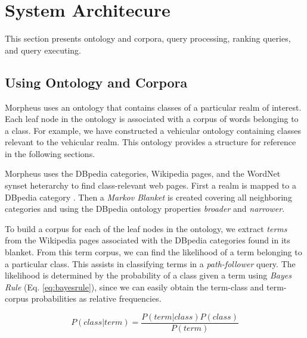 \section{System Architecure}
\label{sec:systemarch}

This section presents ontology and corpora, query processing, ranking queries, and query executing.

\subsection{Using Ontology and Corpora} 
\label{sec:ontology_corpora}

Morpheus uses an ontology that contains classes of a particular realm of interest. Each leaf node in the ontology is associated with a corpus of words belonging to a class.  For example, we have constructed a vehicular ontology containing classes relevant to the vehicular realm. This ontology provides a structure for reference in the following sections.



Morpheus uses the DBpedia categories, Wikipedia pages, and the WordNet synset heterarchy to find class-relevant web pages. First a realm is mapped to a DBpedia category \cite{Bizer2009}. Then a \emph{Markov Blanket} \cite{PRIS} is created covering all neighboring categories and using the DBpedia ontology properties \emph{broader} and \emph{narrower}.


To build a corpus for each of the leaf nodes in the ontology, we extract \emph{terms} from the Wikipedia pages associated with the DBpedia categories found in its blanket. From this term corpus, we can find the likelihood of a term belonging to a particular class. This assists in classifying terms in a \emph{path-follower} query. The likelihood is determined by the probability of a class given a term using \textit{Bayes Rule} (Eq. \ref{eq:bayesrule}), since we can easily obtain the term-class and term-corpus probabilities as relative frequencies. 


\begin{equation}
\label{eq:bayesrule}
P (class | term) = \frac{P(term | class) P(class)}{P(term)}
\end{equation}    

